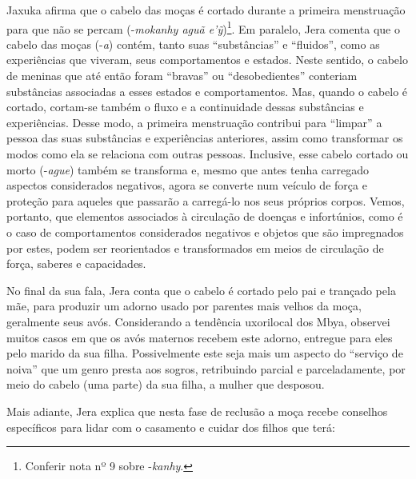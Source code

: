\bigskip

Jaxuka afirma que o cabelo das moças é cortado durante a primeira
menstruação para que não se percam (-\emph{mokanhy aguã
e’ỹ})\footnote{Conferir nota nº 9 sobre -\emph{kanhy}.}. Em paralelo,
Jera comenta que o cabelo das moças (-\emph{a}) contém, tanto suas
``substâncias'' e ``fluidos'', como as experiências que viveram, seus
comportamentos e estados. Neste sentido, o cabelo de meninas que até
então foram ``bravas'' ou ``desobedientes'' conteriam substâncias
associadas a esses estados e comportamentos. Mas, quando o cabelo é
cortado, cortam-se também o fluxo e a continuidade dessas substâncias e
experiências. Desse modo, a primeira menstruação contribui para
``limpar'' a pessoa das suas substâncias e experiências anteriores, assim
como transformar os modos como ela se relaciona com outras pessoas.
Inclusive, esse cabelo cortado ou morto (-\emph{ague}) também se transforma e,
mesmo que antes tenha carregado aspectos considerados negativos, agora
se converte num veículo de força e proteção para aqueles que passarão a
carregá-lo nos seus próprios corpos. Vemos, portanto, que elementos
associados à circulação de doenças e infortúnios, como é o caso de
comportamentos considerados negativos e objetos que são impregnados por
estes, podem ser reorientados e transformados em meios de circulação de
força, saberes e capacidades. 

No final da sua fala, Jera conta que o cabelo é cortado pelo pai e
trançado pela mãe, para produzir um adorno usado por parentes mais
velhos da moça, geralmente seus avós. Considerando a tendência
uxorilocal dos Mbya, observei muitos casos em que os avós maternos
recebem este adorno, entregue para eles pelo marido da sua filha.
Possivelmente este seja mais um aspecto do ``serviço de noiva'' que um
genro presta aos sogros, retribuindo parcial e parceladamente, por meio
do cabelo (uma parte) da sua filha, a mulher que desposou. 

Mais adiante, Jera explica que nesta fase de reclusão a moça recebe
conselhos específicos para lidar com o casamento e cuidar dos filhos
que terá: 

